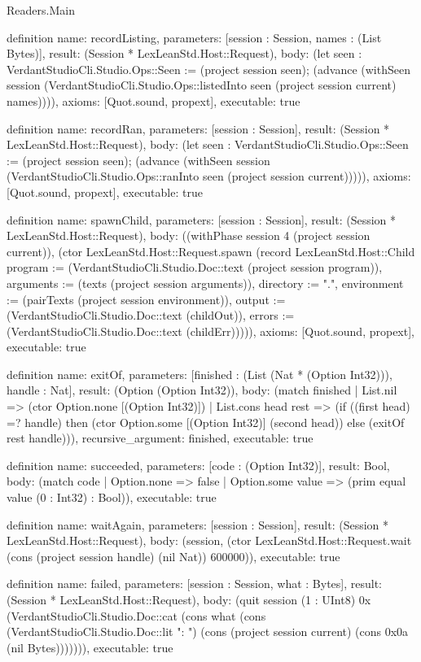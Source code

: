 \begin{lexlean}{Readers.Main}
\begin{semanticmodule}
definition{
  name: recordListing,
  parameters: [session : Session, names : (List Bytes)],
  result: (Session * LexLeanStd.Host::Request),
  body: (let seen : VerdantStudioCli.Studio.Ops::Seen := (project session seen); (advance (withSeen session (VerdantStudioCli.Studio.Ops::listedInto seen (project session current) names)))),
  axioms: [Quot.sound, propext],
  executable: true
}

definition{
  name: recordRan,
  parameters: [session : Session],
  result: (Session * LexLeanStd.Host::Request),
  body: (let seen : VerdantStudioCli.Studio.Ops::Seen := (project session seen); (advance (withSeen session (VerdantStudioCli.Studio.Ops::ranInto seen (project session current))))),
  axioms: [Quot.sound, propext],
  executable: true
}

definition{
  name: spawnChild,
  parameters: [session : Session],
  result: (Session * LexLeanStd.Host::Request),
  body: ((withPhase session 4 (project session current)), (ctor LexLeanStd.Host::Request.spawn (record LexLeanStd.Host::Child {program := (VerdantStudioCli.Studio.Doc::text (project session program)), arguments := (texts (project session arguments)), directory := ".", environment := (pairTexts (project session environment)), output := (VerdantStudioCli.Studio.Doc::text (childOut)), errors := (VerdantStudioCli.Studio.Doc::text (childErr))}))),
  axioms: [Quot.sound, propext],
  executable: true
}

definition{
  name: exitOf,
  parameters: [finished : (List (Nat * (Option Int32))), handle : Nat],
  result: (Option (Option Int32)),
  body: (match finished
    | List.nil => (ctor Option.none [(Option Int32)])
    | List.cons head rest => (if ((first head) =? handle) then (ctor Option.some [(Option Int32)] (second head)) else (exitOf rest handle))),
  recursive_argument: finished,
  executable: true
}

definition{
  name: succeeded,
  parameters: [code : (Option Int32)],
  result: Bool,
  body: (match code
    | Option.none => false
    | Option.some value => (prim equal value (0 : Int32) : Bool)),
  executable: true
}

definition{
  name: waitAgain,
  parameters: [session : Session],
  result: (Session * LexLeanStd.Host::Request),
  body: (session, (ctor LexLeanStd.Host::Request.wait (cons (project session handle) (nil Nat)) 600000)),
  executable: true
}

definition{
  name: failed,
  parameters: [session : Session, what : Bytes],
  result: (Session * LexLeanStd.Host::Request),
  body: (quit session (1 : UInt8) 0x (VerdantStudioCli.Studio.Doc::cat (cons what (cons (VerdantStudioCli.Studio.Doc::lit ": ") (cons (project session current) (cons 0x0a (nil Bytes))))))),
  executable: true
}


\end{semanticmodule}
\end{lexlean}

